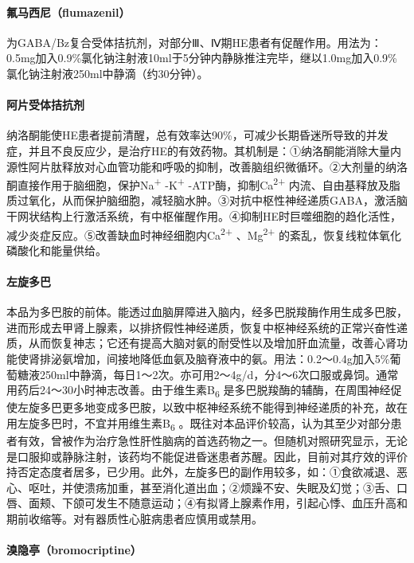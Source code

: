 \paragraph{氟马西尼（flumazenil）}

为GABA/Bz复合受体拮抗剂，对部分Ⅲ、Ⅳ期HE患者有促醒作用。用法为：0.5mg加入0.9\%氯化钠注射液10ml于5分钟内静脉推注完毕，继以1.0mg加入0.9\%氯化钠注射液250ml中静滴（约30分钟）。

\paragraph{阿片受体拮抗剂}

纳洛酮能使HE患者提前清醒，总有效率达90\%，可减少长期昏迷所导致的并发症，并且不良反应少，是治疗HE的有效药物。其机制是：①纳洛酮能消除大量内源性阿片肽释放对心血管功能和呼吸的抑制，改善脑组织微循环。②大剂量的纳洛酮直接作用于脑细胞，保护Na\textsuperscript{+}
-K\textsuperscript{+} -ATP酶，抑制Ca\textsuperscript{2+}
内流、自由基释放及脂质过氧化，从而保护脑细胞，减轻脑水肿。③对抗中枢性神经递质GABA，激活脑干网状结构上行激活系统，有中枢催醒作用。④抑制HE时巨噬细胞的趋化活性，减少炎症反应。⑤改善缺血时神经细胞内Ca\textsuperscript{2+}
、Mg\textsuperscript{2+} 的紊乱，恢复线粒体氧化磷酸化和能量供给。

\paragraph{左旋多巴}

本品为多巴胺的前体。能透过血脑屏障进入脑内，经多巴脱羧酶作用生成多巴胺，进而形成去甲肾上腺素，以排挤假性神经递质，恢复中枢神经系统的正常兴奋性递质，从而恢复神志；它还有提高大脑对氨的耐受性以及增加肝血流量，改善心肾功能使肾排泌氨增加，间接地降低血氨及脑脊液中的氨。用法：0.2～0.4g加入5\%葡萄糖液250ml中静滴，每日1～2次。亦可用2～4g/d，分4～6次口服或鼻饲。通常用药后24～30小时神志改善。由于维生素B\textsubscript{6}
是多巴脱羧酶的辅酶，在周围神经促使左旋多巴更多地变成多巴胺，以致中枢神经系统不能得到神经递质的补充，故在用左旋多巴时，不宜并用维生素B\textsubscript{6}
。既往对本品评价较高，认为其至少对部分患者有效，曾被作为治疗急性肝性脑病的首选药物之一。但随机对照研究显示，无论是口服抑或静脉注射，该药均不能促进昏迷患者苏醒。因此，目前对其疗效的评价持否定态度者居多，已少用。此外，左旋多巴的副作用较多，如：①食欲减退、恶心、呕吐，并使溃疡加重，甚至消化道出血；②烦躁不安、失眠及幻觉；③舌、口唇、面颊、下颌可发生不随意运动；④有拟肾上腺素作用，引起心悸、血压升高和期前收缩等。对有器质性心脏病患者应慎用或禁用。

\paragraph{溴隐亭（bromocriptine）}


